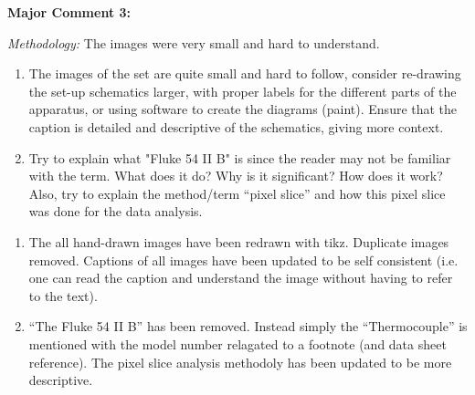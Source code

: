 \documentclass[%
 aip,
cp,  %
 amsmath,amssymb,
 reprint,%
]{revtex4-2}
\begin{document}
        \begin{mdframed} \textbf{Major Comment 3:} 

            \textit{Methodology:} The images were very small and hard to understand.

            \begin{enumerate}
                \item The images of the set are quite small and hard to follow, consider re-drawing the set-up schematics larger, with proper labels for the different parts of the apparatus, or using software to create the diagrams (paint). Ensure that the caption is detailed and descriptive of the schematics, giving more context.
                \item Try to explain what "Fluke 54 II B" is since the reader may not be familiar with the term. What does it do? Why is it significant? How does it work? Also, try to explain the method/term ``pixel slice'' and how this pixel slice was done for the data analysis.
            \end{enumerate}
        \end{mdframed}
        {\color{red}
        
        \begin{enumerate}
            \item The all hand-drawn images have been redrawn with tikz. Duplicate images removed. Captions of all images have been updated to be self consistent (i.e. one can read the caption and understand the image without having to refer to the text).
            \item ``The Fluke 54 II B'' has been removed. Instead simply the ``Thermocouple'' is mentioned with the model number relagated to a footnote (and data sheet reference). The pixel slice analysis methodoly has been updated to be more descriptive.
        \end{enumerate}

        }
\end{document}
